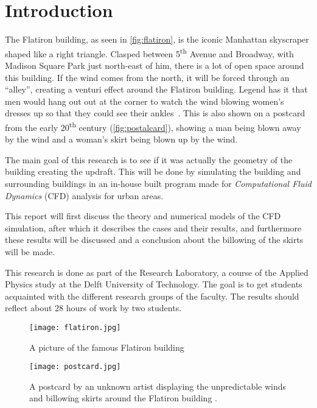 \section{Introduction}
\label{intro}
The Flatiron building, as seen in \autoref{fig:flatiron}, is the iconic Manhattan skyscraper shaped like a right triangle. Clasped between 5\textsuperscript{th} Avenue and Broadway, with Madison Square Park just north-east of him, there is a lot of open space around this building. If the wind comes from the north, it will be forced through an ``alley'', creating a venturi effect around the Flatiron building. Legend has it that men would hang out out at the corner to watch the wind blowing women's dresses up so that they could see their ankles~\cite{dresses}. This is also shown on a postcard from the early 20\textsuperscript{th} century (\autoref{fig:postalcard}), showing a man being blown away by the wind and a woman's skirt being blown up by the wind.  

The main goal of this research is to see if it was actually the geometry of the building creating the updraft. This will be done by simulating the building and surrounding buildings in an in-house built program made for \emph{Computational Fluid Dynamics} (CFD) analysis for urban areas.

This report will first discuss the theory and numerical models of the CFD simulation, after which it describes the cases and their results, and furthermore these results will be discussed and a conclusion about the billowing of the skirts will be made.

This research is done as part of the Research Laboratory, a course of the Applied Physics study at the Delft University of Technology. The goal is to get students acquainted with the different research groups of the faculty. The results should reflect about 28 hours of work by two students. 

\begin{figure}[ph]
\centering
\texttt{[image: flatiron.jpg]}
\caption{A picture of the famous Flatiron building}
\label{fig:flatiron}
\end{figure}
\begin{figure}[p]
\centering
\texttt{[image: postcard.jpg]}
\caption{A postcard by an unknown artist displaying the unpredictable winds and billowing skirts around the Flatiron building \cite{postalcard}.}
\label{fig:postalcard}
\end{figure}